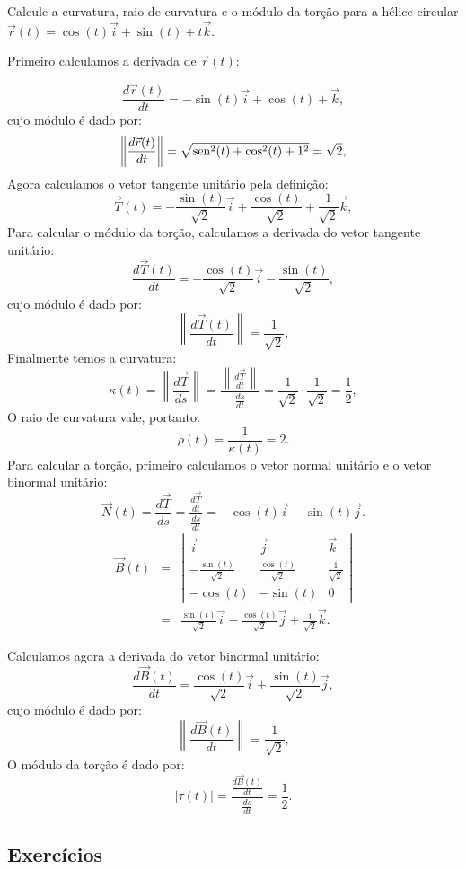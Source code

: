 \begin{exeresol} Calcule a curvatura, raio de curvatura e o módulo da torção para a hélice circular $\vec{r}(t)=\cos(t)\vec{i}+\sin(t)+t\vec{k}$.
\end{exeresol}
Primeiro calculamos a derivada de $\vec{r}(t)$:
\begin{resol}
$$
\frac{d\vec{r}(t)}{dt}=-\sin(t)\vec{i}+\cos(t)+\vec{k},
$$
cujo módulo é dado por:
$$
\left\|\frac{d\vec{r}(t)}{dt}\right\|=\sqrt{\operatorname{sen}^2(t)+\cos^2(t)+1^2}=\sqrt{2},
$$
Agora calculamos o vetor tangente unitário pela definição:
$$
\vec{T}(t)=-\frac{\sin(t)}{\sqrt{2}}\vec{i}+\frac{\cos(t)}{\sqrt{2}}+\frac{1}{\sqrt{2}}\vec{k},
$$
Para calcular o módulo da torção, calculamos a derivada do vetor tangente unitário:
$$
\frac{d\vec{T}(t)}{dt}=-\frac{\cos(t)}{\sqrt{2}}\vec{i}-\frac{\sin(t)}{\sqrt{2}},
$$
cujo módulo é dado por:
$$
\left\|\frac{d\vec{T}(t)}{dt}\right\|=\frac{1}{\sqrt{2}},
$$
Finalmente temos a curvatura:
$$
\kappa(t)=\left\|\frac{d\vec{T}}{ds}\right\|=\frac{\left\|\frac{d\vec{T}}{dt}\right\|}{\frac{ds}{dt}} = \frac{1}{\sqrt{2}}\cdot \frac{1}{\sqrt{2}}=\frac{1}{2},
$$
O raio de curvatura vale, portanto:
$$
\rho(t)=\frac{1}{\kappa(t)}=2.
$$
Para calcular a torção, primeiro calculamos o vetor normal unitário e o vetor binormal unitário:
$$
\vec{N}(t)=\frac{d\vec{T}}{ds} = \frac{\frac{d\vec{T}}{dt}}{\frac{ds}{dt}}=-\cos(t)\vec{i}-\sin(t)\vec{j}.
$$
\begin{eqnarray*}
\vec{B}(t)&=&\left|\begin{array}{ccc}\vec{i}&\vec{j}&\vec{k}\\-\frac{\sin(t)}{\sqrt{2}}&\frac{\cos(t)}{\sqrt{2}}&\frac{1}{\sqrt{2}}\\-\cos(t)&-\sin(t)&0\end{array}\right|\\
&=&\frac{\sin(t)}{\sqrt{2}}\vec{i}-\frac{\cos(t)}{\sqrt{2}}\vec{j}+\frac{1}{\sqrt{2}}\vec{k}.
\end{eqnarray*}

Calculamos agora a derivada do vetor binormal unitário:
$$
\frac{d\vec{B}(t)}{dt}=\frac{\cos(t)}{\sqrt{2}}\vec{i}+\frac{\sin(t)}{\sqrt{2}}\vec{j},
$$
cujo módulo é dado por:
$$
\left\|\frac{d\vec{B}(t)}{dt}\right\|=\frac{1}{\sqrt{2}},
$$
O módulo da torção é dado por:
$$
|\tau(t)|=\frac{\frac{d\vec{B}(t)}{dt}}{\frac{ds}{dt}}=\frac{1}{2}.
$$
\end{resol}

\subsection*{Exercícios}

